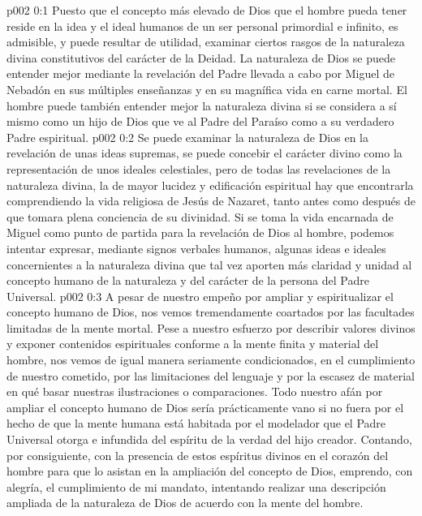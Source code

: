 \author{Consejero divino}
\vs p002 0:1 Puesto que el concepto más elevado de Dios que el hombre pueda tener reside en la idea y el ideal humanos de un ser personal primordial e infinito, es admisible, y puede resultar de utilidad, examinar ciertos rasgos de la naturaleza divina constitutivos del carácter de la Deidad. La naturaleza de Dios se puede entender mejor mediante la revelación del Padre llevada a cabo por Miguel de Nebadón en sus múltiples enseñanzas y en su magnífica vida en carne mortal. El hombre puede también entender mejor la naturaleza divina si se considera a sí mismo como un hijo de Dios que ve al Padre del Paraíso como a su verdadero Padre espiritual.
\vs p002 0:2 Se puede examinar la naturaleza de Dios en la revelación de unas ideas supremas, se puede concebir el carácter divino como la representación de unos ideales celestiales, pero de todas las revelaciones de la naturaleza divina, la de mayor lucidez y edificación espiritual hay que encontrarla comprendiendo la vida religiosa de Jesús de Nazaret, tanto antes como después de que tomara plena conciencia de su divinidad. Si se toma la vida encarnada de Miguel como punto de partida para la revelación de Dios al hombre, podemos intentar expresar, mediante signos verbales humanos, algunas ideas e ideales concernientes a la naturaleza divina que tal vez aporten más claridad y unidad al concepto humano de la naturaleza y del carácter de la persona del Padre Universal.
\vs p002 0:3 A pesar de nuestro empeño por ampliar y espiritualizar el concepto humano de Dios, nos vemos tremendamente coartados por las facultades limitadas de la mente mortal. Pese a nuestro esfuerzo por describir valores divinos y exponer contenidos espirituales conforme a la mente finita y material del hombre, nos vemos de igual manera seriamente condicionados, en el cumplimiento de nuestro cometido, por las limitaciones del lenguaje y por la escasez de material en qué basar nuestras ilustraciones o comparaciones. Todo nuestro afán por ampliar el concepto humano de Dios sería prácticamente vano si no fuera por el hecho de que la mente humana está habitada por el modelador que el Padre Universal otorga e infundida del espíritu de la verdad del hijo creador. Contando, por consiguiente, con la presencia de estos espíritus divinos en el corazón del hombre para que lo asistan en la ampliación del concepto de Dios, emprendo, con alegría, el cumplimiento de mi mandato, intentando realizar una descripción ampliada de la naturaleza de Dios de acuerdo con la mente del hombre.
